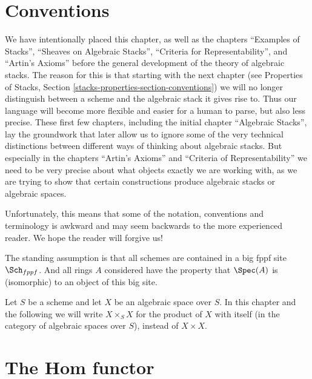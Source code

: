 \section{Conventions}
\label{section-conventions}

\noindent
We have intentionally placed this chapter, as well as the chapters
``Examples of Stacks'', ``Sheaves on Algebraic Stacks'',
``Criteria for Representability'', and ``Artin's Axioms'' before the
general development of the theory of algebraic stacks. The reason
for this is that starting with the next chapter (see
Properties of Stacks, Section \ref{stacks-properties-section-conventions})
we will no longer distinguish between a scheme and the algebraic stack
it gives rise to. Thus our language will become more flexible and
easier for a human to parse, but also less precise. These first few
chapters, including the initial chapter ``Algebraic Stacks'', lay the
groundwork that later allow us to ignore some of the very technical
distinctions between different ways of thinking about algebraic stacks.
But especially in the chapters ``Artin's Axioms'' and
``Criteria of Representability'' we need
to be very precise about what objects exactly we are working with, as
we are trying to show that certain constructions produce algebraic stacks or
algebraic spaces.

\medskip\noindent
Unfortunately, this means that some of the notation, conventions and
terminology is awkward and may seem backwards to the more experienced
reader. We hope the reader will forgive us!

\medskip\noindent
The standing assumption is that all schemes are contained in
a big fppf site $\Sch_{fppf}$. And all rings $A$ considered
have the property that $\Spec(A)$ is (isomorphic) to an
object of this big site.

\medskip\noindent
Let $S$ be a scheme and let $X$ be an algebraic space over $S$.
In this chapter and the following we will write $X \times_S X$
for the product of $X$ with itself (in the category of algebraic
spaces over $S$), instead of $X \times X$.















\section{The Hom functor}
\label{section-hom}

